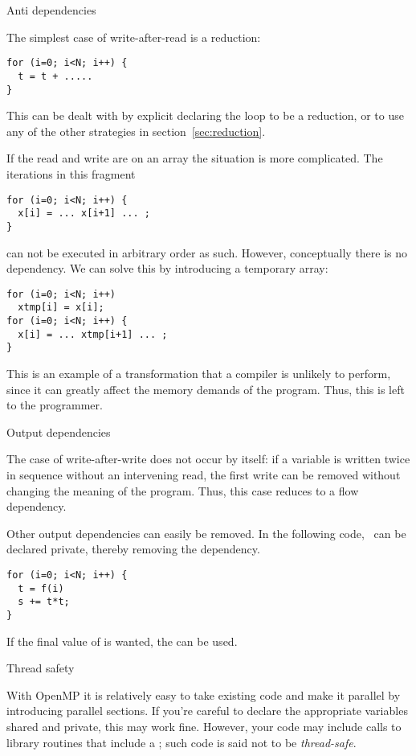  {Anti dependencies}

The simplest case of write-after-read is a reduction:
\begin{verbatim}
for (i=0; i<N; i++) {
  t = t + .....
}
\end{verbatim}
This can be dealt with by explicit declaring the loop to be a reduction,
or to use any of the other strategies in section~\ref{sec:reduction}.

If the read and write are on an array the situation is more complicated.
The iterations in this fragment
\begin{verbatim}
for (i=0; i<N; i++) {
  x[i] = ... x[i+1] ... ;
}
\end{verbatim}
can not be executed in arbitrary order as such. However, conceptually there
is no dependency. We can solve this by introducing a temporary array:
\begin{verbatim}
for (i=0; i<N; i++)
  xtmp[i] = x[i];
for (i=0; i<N; i++) {
  x[i] = ... xtmp[i+1] ... ;
}
\end{verbatim}
This is an example of a transformation that a compiler is unlikely
to perform, since it can greatly affect the memory demands of the program.
Thus, this is left to the programmer.

 {Output dependencies}

The case of write-after-write does not occur by itself:
if a variable is written twice in sequence without an intervening
read, the first write can be removed without changing the meaning of the program.
Thus, this case reduces to a flow dependency.

Other output dependencies can easily be removed. In the following code, ~can be
declared private, thereby removing the dependency.
\begin{verbatim}
for (i=0; i<N; i++) {
  t = f(i)
  s += t*t;
}
\end{verbatim}
If the final value of  is wanted, the  can be used.


 {Thread safety}

With OpenMP it is relatively easy to take existing code and make
it parallel by introducing parallel sections. If you're careful
to declare the appropriate variables shared and private,
this may work fine. However, your code may include
calls to library routines that include a ;
such code is said not to be \emph{thread-safe}.

